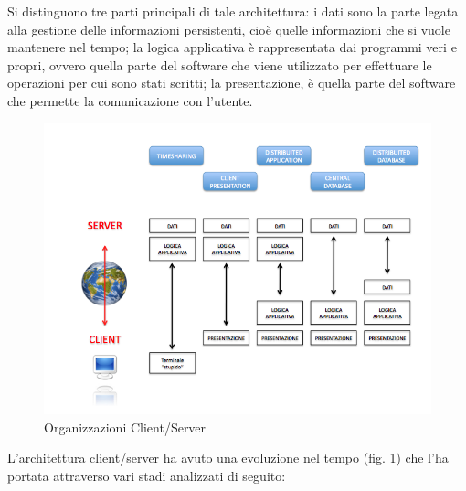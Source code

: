 Si distinguono tre parti principali di tale architettura: i dati sono la parte legata alla gestione delle informazioni persistenti, cioè quelle informazioni che si vuole mantenere nel tempo; la logica applicativa è rappresentata dai programmi veri e propri, ovvero quella parte del software che viene utilizzato per effettuare le operazioni per cui sono stati scritti; la presentazione, è quella parte del software che permette la comunicazione con l'utente.
\begin{figure}[h]
\begin{center}
\includegraphics[scale=0.55]{imgs/clientserverorganization.png} 
\caption{Organizzazioni Client/Server\label{clientserverorganization}}
\end{center}
\end{figure}
L'architettura client/server ha avuto una evoluzione nel tempo (fig. \ref{clientserverorganization}) che l'ha portata attraverso vari stadi analizzati di seguito:
